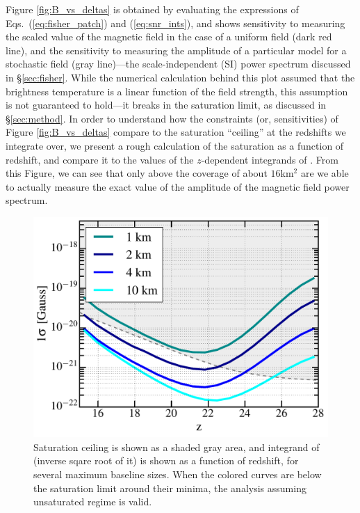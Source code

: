 Figure \ref{fig:B_vs_deltas} is obtained by evaluating the expressions of Eqs.~(\ref{eq:fisher_patch}) and (\ref{eq:snr_ints}), and shows sensitivity to measuring the scaled value of the magnetic field in the case of a uniform field (dark red line), and the sensitivity to measuring the amplitude of a particular model for a stochastic field (gray line)---the scale-independent (SI) power spectrum discussed in \S\ref{sec:fisher}. While the numerical calculation behind this plot assumed that the brightness temperature is a linear function of the field strength, this assumption is not guaranteed to hold---it breaks in the saturation limit, as discussed in \S\ref{sec:method}. In order to understand how the constraints (or, sensitivities) of Figure \ref{fig:B_vs_deltas} compare to the saturation ``ceiling'' at the redshifts we integrate over, we present a rough calculation of the saturation as a function of redshift, and compare it to the values of the $z$-dependent integrands of \eq{\ref{eq:fisher_patch}}. From this Figure, we can see that only above the coverage of about $16$km$^2$ are we able to actually measure the exact value of the amplitude of the magnetic field power spectrum.
\begin{figure}
\centering
\includegraphics[width=.35\textwidth,keepaspectratio=true]{sigmaB0_vs_z.pdf}
\caption{Saturation ceiling is shown as a shaded gray area, and integrand of \eq{\ref{eq:fisher_patch}} (inverse sqare root of it) is shown as a function of redshift, for several maximum baseline sizes.  When the colored curves are below the saturation limit around their minima, the analysis assuming unsaturated regime is valid.\label{fig:Bsat}}
\end{figure}
